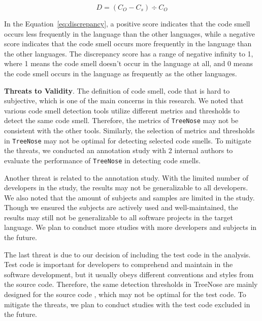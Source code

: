 
\begin{equation}
    D = (C_{O} - C_{s}) \div C_{O}
    \label{eq:discrepancy}
\end{equation}

In the Equation~\ref{eq:discrepancy}, a positive score indicates that the code smell occurs less
frequently in the language than the other languages, while a negative score
indicates that the code smell occurs more frequently in the language than the
other languages. The discrepancy score has a range of negative infinity to 1,
where 1 means the code smell doesn't occur in the language at all, and 0 means
the code smell occurs in the language as frequently as the other languages.

{\bf Threats to Validity}. The definition of code smell, code that is hard to
subjective, which is one of the main concerns in this research. 
We noted that various code smell detection tools
utilize different metrics and thresholds to detect the same code smell.
Therefore, the metrics of \texttt{TreeNose} may not be consistent with the
other tools. Similarly, the selection of metrics and thresholds in
\texttt{TreeNose} may not be optimal for detecting selected code smells. To
mitigate the threats, we conducted an annotation study with 2 internal authors to
evaluate the performance of \texttt{TreeNose} in detecting code smells.

Another threat is related to the annotation study. With the limited number of developers in the study, the results may not be
generalizable to all developers. We also noted that the amount of subjects and
samples are limited in the study. Though we ensured the subjects are actively
used and well-maintained, the results may still not be generalizable to all
software projects in the target language. We plan to conduct more studies
with more developers and subjects in the future.





The last threat is due to our decision of including the test code in the
analysis. Test code is important for developers to comprehend and maintain in 
the software development, but
it usually obeys different conventions and styles from the source code. Therefore,
the same detection thresholds in TreeNose are mainly designed for the source code
, which may not be optimal for the test code. 
To mitigate the threats, we plan to conduct studies with the test code excluded in the future.
